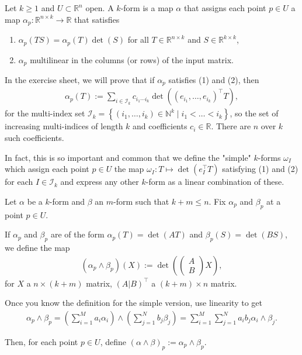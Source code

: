 \begin{definition}\label{def:k-form}
	Let $k \geq 1$ and $U \subset \mathbb{R}^{n}$ open. A $k$-form is a map $\alpha$ that assigns each point $p \in U$ a map $\alpha_{p}: \mathbb{R}^{n \times k} \to \mathbb{R}$
	that satisfies
	\begin{enumerate}
		\item $\alpha_{p}(TS) = \alpha_{p}(T) \det (S)$ for all $T \in \mathbb{R}^{n \times k}$ and $S \in \mathbb{R}^{k \times k}$,
		\item $\alpha_{p}$ multilinear in the columns (or rows) of the input matrix.
	\end{enumerate}
	In the exercise sheet, we will prove that if $\alpha_{p}$ satisfies (1) and (2), then
	\begin{align*}
		\alpha_{p} (T) := \sum_{i \in \mathcal{I}_{k}} c_{i_{1} \cdots i_{k}} \det ((e_{i_{1}}, \dots, e_{i_{k}})^\top T),
	\end{align*}
	for the multi-index set $\mathcal{I}_{k} = \left\{ (i_{1}, \dots, i_{k}) \in \mathbb{N}^{k} \mid i_{1} < \dots < i_{k} \right\}$, so the set of increasing multi-indices of length $k$ and coefficients $c_{i} \in \mathbb{R}$. There are $n$ over $k$ such coefficients.

	In fact, this is so important and common that we define the "simple" $k$-forms $\omega_{I}$ which assign each point $p \in U$ the map $\omega_{I}: T \mapsto \det(e_{I}^\top T)$ satisfying (1) and (2) for each $I \in \mathcal{I}_{k}$ and express any other $k$-form as a linear combination of these.
\end{definition}

\begin{definition}\label{def:wedge-product}
	Let $\alpha $ be a $k$-form and $\beta$ an $m$-form such that $k + m \leq n$. Fix $\alpha_{p}$ and $\beta_{p}$ at a point $p \in U$.

	If $\alpha_{p}$ and $\beta_{p} $ are of the form $\alpha_{p}(T) = \det (A T)$ and $\beta_{p} (S) = \det (B S)$, we define the map
	\begin{align*}
		(\alpha_{p} \wedge \beta_{p})(X) := \det \left( \begin{pmatrix} A \\ \hline B \end{pmatrix} X \right),
	\end{align*}
	for $X$ a $n \times (k+m)$ matrix, $(A | B)^\top$ a $(k+m) \times n$ matrix.

	Once you know the definition for the simple version, use linearity to get
	\begin{align*}
		\alpha_{p} \wedge \beta_{p} = \left( \sum_{i=1}^{M} a_{i} \alpha_{i} \right) \wedge \left( \sum_{j=1}^{N} b_{j} \beta_{j} \right) = \sum_{i=1}^{M} \sum_{j=1}^{N} a_{i} b_{j} \alpha_{i} \wedge \beta_{j}.
	\end{align*}

	Then, for each point $p \in U$, define $(\alpha \wedge \beta )_{p} := \alpha_{p} \wedge \beta_{p}$.
\end{definition}


